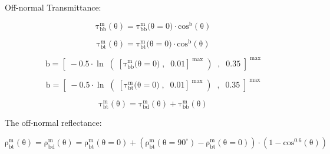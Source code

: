 Off-normal Transmittance:

\begin{equation}
{\mathrm{\tau }}_{{\mathrm{bb}}}^{\mathrm{m}}\left( {\mathrm{\theta }} \right) = {\mathrm{\tau }}_{{\mathrm{bb}}}^{\mathrm{m}}{\mathrm{(\theta }} = {\mathrm{0)}} \cdot {\mathrm{co}}{{\mathrm{s}}^{\mathrm{b}}}\left( {\mathrm{\theta }} \right)
\end{equation}

\begin{equation}
{\mathrm{\tau }}_{{\mathrm{bt}}}^{\mathrm{m}}\left( {\mathrm{\theta }} \right) = {\mathrm{\tau }}_{{\mathrm{bt}}}^{\mathrm{m}}{\mathrm{(\theta }} = {\mathrm{0)}} \cdot {\mathrm{co}}{{\mathrm{s}}^{\mathrm{b}}}\left( {\mathrm{\theta }} \right)
\end{equation}

\begin{equation}
{\mathrm{b}} = {\left[ {\; - 0.5 \cdot \ln \;\left( {\;{{\left[ {{\mathrm{\tau }}_{{\mathrm{bb}}}^{\mathrm{m}}{\mathrm{(\theta }} = {\mathrm{0)}}\;{\mathrm{,}}\;\;{\mathrm{0}}{\mathrm{.01}}} \right]}^{\;\max }}\;} \right)\;\;,\;\;0.35\;} \right]^{\;\max }}
\end{equation}

\begin{equation}
{\mathrm{b}} = {\left[ {\; - 0.5 \cdot \ln \;\left( {\;{{\left[ {{\mathrm{\tau }}_{{\mathrm{bt}}}^{\mathrm{m}}{\mathrm{(\theta }} = {\mathrm{0)}}\;{\mathrm{,}}\;\;{\mathrm{0}}{\mathrm{.01}}} \right]}^{\;\max }}\;} \right)\;\;,\;\;0.35\;} \right]^{\;\max }}
\end{equation}

\begin{equation}
{\mathrm{\tau }}_{{\mathrm{bt}}}^{\mathrm{m}}\left( {\mathrm{\theta }} \right) = {\mathrm{\tau }}_{{\mathrm{bd}}}^{\mathrm{m}}\left( {\mathrm{\theta }} \right) + {\mathrm{\tau }}_{{\mathrm{bb}}}^{\mathrm{m}}\left( {\mathrm{\theta }} \right)
\end{equation}

The off-normal reflectance:

\begin{equation}
{\mathrm{\rho }}_{{\mathrm{bt}}}^{\mathrm{m}}\left( {\mathrm{\theta }} \right) = {\mathrm{\rho }}_{{\mathrm{bd}}}^{\mathrm{m}}\left( {\mathrm{\theta }} \right) = {\mathrm{\rho }}_{{\mathrm{bt}}}^{\mathrm{m}}\left( {{\mathrm{\theta }} = {\mathrm{0}}} \right) + \left( {{\mathrm{\rho }}_{{\mathrm{bt}}}^{\mathrm{m}}\left( {{\mathrm{\theta }} = 9{\mathrm{0}}^\circ } \right) - {\mathrm{\rho }}_{{\mathrm{bt}}}^{\mathrm{m}}\left( {{\mathrm{\theta }} = {\mathrm{0}}} \right)} \right) \cdot \left( {1 - {\mathrm{co}}{{\mathrm{s}}^{{\mathrm{0}}{\mathrm{.6}}}}\left( {\mathrm{\theta }} \right)} \right)
\end{equation}

